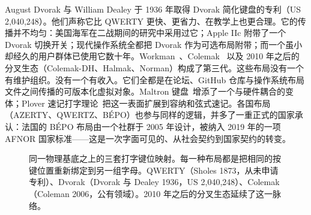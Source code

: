 \documentclass[10pt,letterpaper,twocolumn]{article}
\begin{document}
August Dvorak 与 William Dealey 于 1936 年取得 Dvorak 简化键盘的专利（US 2{,}040{,}248）。他们声称它比 QWERTY 更快、更省力、在教学上也更合理。它的传播并不均匀：美国海军在二战期间的研究中采用过它；Apple IIc 附带了一个 Dvorak 切换开关；现代操作系统全都把 Dvorak 作为可选布局附带；而一个虽小却经久的用户群体已使用它数十年。Workman~\citep{bucao2010workman}、Colemak~\citep{coleman2006colemak} 以及 2010 年之后的分叉生态（Colemak-DH、Halmak、Norman）构成了第三代。这些布局没有一个有维护组织。没有一个有收入。它们全都是在论坛、GitHub 仓库与操作系统布局文件之间传播的可版本化虚拟对象。Maltron 键盘~\citep{malt1977keyboard}增添了一个与硬件耦合的变体；Plover 速记打字理论~\citep{knight2010plover}把这一表面扩展到容纳和弦式速记。各国布局（AZERTY、QWERTZ、BÉPO）也参与同样的逻辑，并多了一重正式的国家承认：法国的 BÉPO 布局由一个社群于 2005 年设计，被纳入 2019 年的一项 AFNOR 国家标准——这是一次字面可见的、从社会契约到国家契约的转变。

\begin{figure}[t]
\centering
{}
\caption{同一物理基底之上的三套打字键位映射。每一种布局都是把相同的按键位置重新绑定到另一组字母。QWERTY（Sholes 1873，从未申请专利）、Dvorak（Dvorak 与 Dealey 1936，US 2{,}040{,}248）、Colemak（Coleman 2006，公有领域）。2010 年之后的分叉生态延续了这一脉络。}
\label{fig:typing-layouts}
\end{figure}
\end{document}
